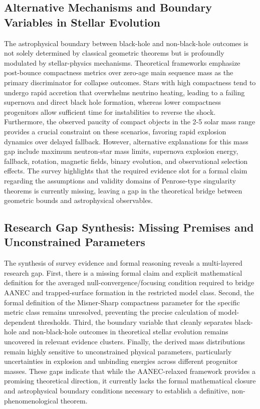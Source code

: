 \documentclass[conference]{IEEEtran}
\begin{document}
\subsection{Alternative Mechanisms and Boundary Variables in Stellar Evolution}
The astrophysical boundary between black-hole and non-black-hole outcomes is not solely determined by classical geometric theorems but is profoundly modulated by stellar-physics mechanisms. Theoretical frameworks emphasize post-bounce compactness metrics over zero-age main sequence mass as the primary discriminator for collapse outcomes. Stars with high compactness tend to undergo rapid accretion that overwhelms neutrino heating, leading to a failing supernova and direct black hole formation, whereas lower compactness progenitors allow sufficient time for instabilities to reverse the shock. Furthermore, the observed paucity of compact objects in the 2-5 solar mass range provides a crucial constraint on these scenarios, favoring rapid explosion dynamics over delayed fallback. However, alternative explanations for this mass gap include maximum neutron-star mass limits, supernova explosion energy, fallback, rotation, magnetic fields, binary evolution, and observational selection effects. The survey highlights that the required evidence slot for a formal claim regarding the assumptions and validity domains of Penrose-type singularity theorems is currently missing, leaving a gap in the theoretical bridge between geometric bounds and astrophysical observables.~\cite{cite_72d7ff391b29c495,cite_7a44e6730c44cb39,cite_7a407c865faafd11,cite_fd0f77b2a173c0ab}

\subsection{Research Gap Synthesis: Missing Premises and Unconstrained Parameters}
The synthesis of survey evidence and formal reasoning reveals a multi-layered research gap. First, there is a missing formal claim and explicit mathematical definition for the averaged null-convergence/focusing condition required to bridge AANEC and trapped-surface formation in the restricted model class. Second, the formal definition of the Misner-Sharp compactness parameter for the specific metric class remains unresolved, preventing the precise calculation of model-dependent thresholds. Third, the boundary variable that cleanly separates black-hole and non-black-hole outcomes in theoretical stellar evolution remains uncovered in relevant evidence clusters. Finally, the derived mass distributions remain highly sensitive to unconstrained physical parameters, particularly uncertainties in explosion and unbinding energies across different progenitor masses. These gaps indicate that while the AANEC-relaxed framework provides a promising theoretical direction, it currently lacks the formal mathematical closure and astrophysical boundary conditions necessary to establish a definitive, non-phenomenological theorem.
\end{document}
